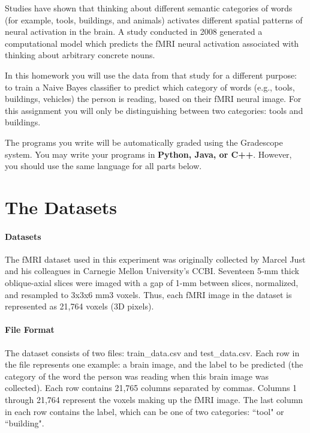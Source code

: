 \documentclass[11pt,addpoints,answers]{exam}
\begin{document}
Studies have shown that thinking about different semantic categories of words (for example, tools, buildings, and animals) activates different spatial patterns of neural activation in the brain. A study conducted in 2008 generated a computational model which predicts the fMRI neural activation associated with thinking about arbitrary concrete nouns.  

In this homework you will use the data from that study for a different purpose: to train a Naive Bayes classifier to predict which category of words (e.g., tools, buildings, vehicles) the person is reading, based on their fMRI neural image. For this assignment you will only be distinguishing between two categories: tools and buildings. 


The programs you write will be automatically graded using the Gradescope system. You may write your programs in \textbf{Python, Java, or C++}. However, you should use the same language for all parts below.
\linebreak

\section{The Datasets}
\label{sec:dataset}

\paragraph{Datasets} 
The fMRI dataset used in this experiment was originally collected by Marcel Just and his colleagues in Carnegie Mellon University's CCBI. Seventeen 5-mm thick oblique-axial slices were imaged with a gap of 1-mm between slices, normalized, and resampled to 3x3x6 mm3 voxels. Thus, each fMRI image in the dataset is represented as 21,764 voxels (3D pixels).


\paragraph{File Format} The dataset consists of two files: train\_data.csv and test\_data.csv. Each row in the file represents one example: a brain image, and the label to be predicted (the category of the word the person was reading when this brain image was collected). Each row contains 21,765 columns separated by commas. Columns 1 through 21,764 represent the voxels making up the fMRI image. The last column in each row contains the label, which can be one of two categories: ``tool" or ``building". 
\end{document}
